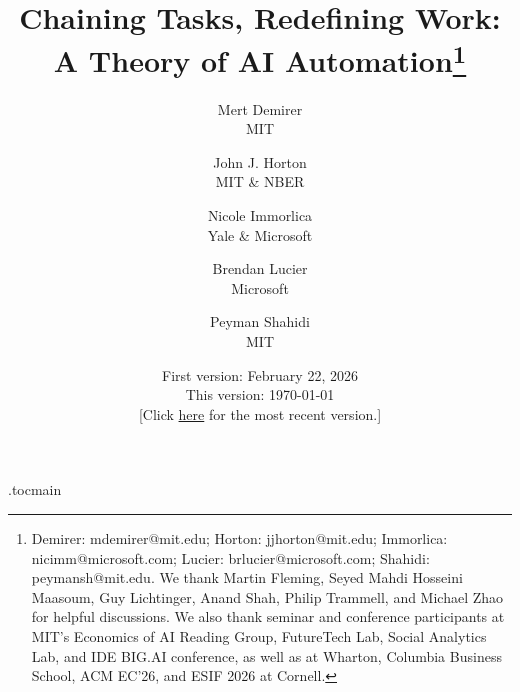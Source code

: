 \documentclass[12pt, final]{article}
\title{Chaining Tasks, Redefining Work:\\ A Theory of AI Automation\thanks{Demirer: \mbox{mdemirer@mit.edu}; Horton: \mbox{jjhorton@mit.edu}; Immorlica: \mbox{nicimm@microsoft.com}; Lucier: \mbox{brlucier@microsoft.com}; Shahidi: \mbox{peymansh@mit.edu}. We thank Martin Fleming, Seyed Mahdi Hosseini Maasoum, Guy Lichtinger, Anand Shah, Philip Trammell, and Michael Zhao for helpful discussions. We also thank seminar and conference participants at MIT's Economics of AI Reading Group, FutureTech Lab, Social Analytics Lab, and IDE BIG.AI conference, as well as at Wharton, Columbia Business School, ACM EC'26, and ESIF 2026 at Cornell.}}
\author{Mert Demirer \\ MIT \and John J. Horton \\ MIT \& NBER \and Nicole Immorlica \\ Yale \& Microsoft \and Brendan Lucier \\ Microsoft \and Peyman Shahidi \\ MIT}
\date{First version: February 22, 2026 \\
This version: \today \\[0.4em]
{\normalsize\color[RGB]{0,51,153}[Click \href{https://peymanshahidi.github.io/assets/pdf/chaining_tasks_ai_automation.pdf}{here} for the most recent version.]}}
\begin{document}
 \etocdepthtag.toc{main}

\ifoptionfinal
{}%
{
{
\small
\thispagestyle{empty}
\tableofcontents
\newpage
\listoffigures
\newpage
\listoftables
\newpage
}
}

\thispagestyle{empty}

\maketitle

\end{document}
